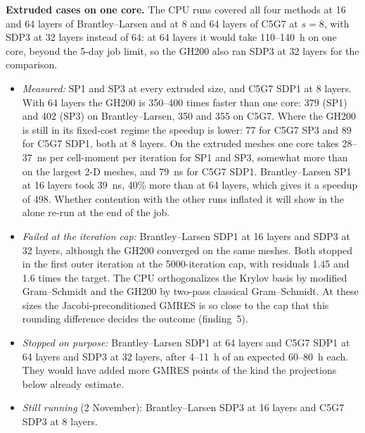 \textbf{Extruded cases on one core.} The CPU runs covered all four methods
at 16 and 64 layers of Brantley--Larsen and at 8 and 64 layers of C5G7 at
$s = 8$, with SDP3 at 32 layers instead of 64: at 64 layers it would take
110--140~h on one core, beyond the 5-day job limit, so the GH200 also ran
SDP3 at 32 layers for the comparison.
\begin{itemize}
\item \emph{Measured:} SP1 and SP3 at every extruded size, and C5G7 SDP1 at
  8 layers. With 64 layers the GH200 is 350--400 times faster than one core:
  379 (SP1) and 402 (SP3) on Brantley--Larsen, 350 and 355 on C5G7. Where
  the GH200 is still in its fixed-cost regime the speedup is lower: 77 for
  C5G7 SP3 and 89 for C5G7 SDP1, both at 8 layers. On the extruded meshes
  one core takes 28--37~ns per cell-moment per iteration for SP1 and SP3,
  somewhat more than on the largest 2-D meshes, and 79~ns for C5G7 SDP1.
  Brantley--Larsen SP1 at 16 layers took 39~ns, 40\% more than at 64 layers,
  which gives it a speedup of 498. Whether contention with the other runs
  inflated it will show in the alone re-run at the end of the job.
\item \emph{Failed at the iteration cap:} Brantley--Larsen SDP1 at 16 layers
  and SDP3 at 32 layers, although the GH200 converged on the same meshes.
  Both stopped in the first outer iteration at the 5000-iteration cap, with
  residuals 1.45 and 1.6 times the target. The CPU orthogonalizes the Krylov
  basis by modified Gram--Schmidt and the GH200 by two-pass classical
  Gram--Schmidt. At these sizes the Jacobi-preconditioned GMRES is so close
  to the cap that this rounding difference decides the outcome (finding~5).
\item \emph{Stopped on purpose:} Brantley--Larsen SDP1 at 64 layers and C5G7
  SDP1 at 64 layers and SDP3 at 32 layers, after 4--11~h of an expected
  60--80~h each. They would have added more GMRES points of the kind the
  projections below already estimate.
\item \emph{Still running} (2 November): Brantley--Larsen SDP3 at 16 layers
  and C5G7 SDP3 at 8 layers.
\end{itemize}


